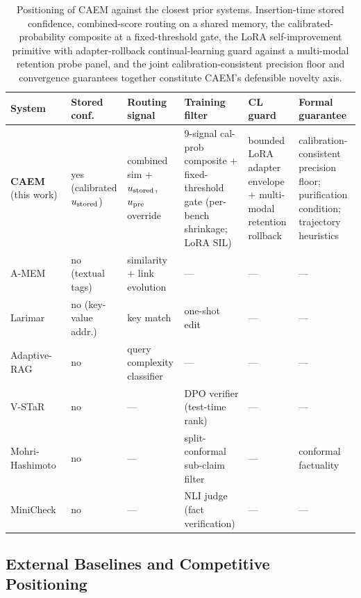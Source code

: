 \begin{table}[!htbp]
\centering
\footnotesize
\begin{tabular}{@{}p{2.4cm}p{1.7cm}p{2.6cm}p{2.5cm}p{2.0cm}p{2.0cm}@{}}
\toprule
\textbf{System} & \textbf{Stored conf.} & \textbf{Routing signal} & \textbf{Training filter} & \textbf{CL guard} & \textbf{Formal guarantee} \\
\midrule
\textbf{CAEM} (this work) & yes (calibrated $u_{\text{stored}}$) & combined sim $+$ $u_{\text{stored}}$, $u_{\text{pre}}$ override & 9-signal cal-prob composite $+$ fixed-threshold gate (per-bench shrinkage; LoRA SIL) & bounded LoRA adapter envelope $+$ multi-modal retention rollback & calibration-consistent precision floor; purification condition; trajectory heuristics \\
A-MEM~\cite{xu2025amem} & no (textual tags) & similarity $+$ link evolution & --- & --- & --- \\
Larimar~\cite{larimar2024das} & no (key-value addr.) & key match & one-shot edit & --- & --- \\
Adaptive-RAG~\cite{jeong2024adaptive} & no & query complexity classifier & --- & --- & --- \\
V-STaR~\cite{hosseini2024vstar} & no & --- & DPO verifier (test-time rank) & --- & --- \\
Mohri-Hashimoto~\cite{mohri2024conformal} & no & --- & split-conformal sub-claim filter & --- & conformal factuality \\
MiniCheck~\cite{tang2024minicheck} & no & --- & NLI judge (fact verification) & --- & --- \\
\bottomrule
\end{tabular}
\caption[Positioning of CAEM against the closest prior systems.]{Positioning of CAEM against the closest prior systems. Insertion-time stored confidence, combined-score routing on a shared memory, the calibrated-probability composite at a fixed-threshold gate, the LoRA self-improvement primitive with adapter-rollback continual-learning guard against a multi-modal retention probe panel, and the joint calibration-consistent precision floor and convergence guarantees together constitute CAEM's defensible novelty axis.}
\label{tab:positioning}
\end{table}

\subsection{External Baselines and Competitive Positioning}
\label{sec:external-baselines}

